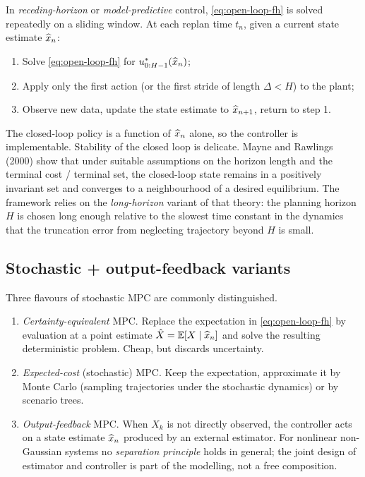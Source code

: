 In \emph{receding-horizon} or \emph{model-predictive} control,
\eqref{eq:open-loop-fh} is solved repeatedly on a sliding window. At
each replan time $t_n$, given a current state estimate $\widehat{x}_n$:
\begin{enumerate}
  \item Solve \eqref{eq:open-loop-fh} for $u_{0:H-1}^*(\widehat{x}_n)$;
  \item Apply only the first action (or the first stride of length
        $\Delta < H$) to the plant;
  \item Observe new data, update the state estimate to $\widehat{x}_{n+1}$,
        return to step 1.
\end{enumerate}
The closed-loop policy is a function of $\widehat{x}_n$ alone, so the
controller is implementable. Stability of the closed loop is delicate.
Mayne and Rawlings (2000) show that under suitable assumptions on the
horizon length and the terminal cost / terminal set, the closed-loop
state remains in a positively invariant set and converges to a
neighbourhood of a desired equilibrium. The framework relies on the
\emph{long-horizon} variant of that theory: the planning horizon $H$
is chosen long enough relative to the slowest time constant in the
dynamics that the truncation error from neglecting trajectory beyond
$H$ is small.

\subsection{Stochastic + output-feedback variants} \label{sec:mpc-variants}

Three flavours of stochastic MPC are commonly distinguished.

\begin{enumerate}
  \item[(i)] \emph{Certainty-equivalent} MPC. Replace the expectation
        in \eqref{eq:open-loop-fh} by evaluation at a point estimate
        $\hat X = \mathbb{E}[X \mid \widehat{x}_n]$ and solve the resulting
        deterministic problem. Cheap, but discards uncertainty.
  \item[(ii)] \emph{Expected-cost} (stochastic) MPC. Keep the
        expectation, approximate it by Monte Carlo (sampling
        trajectories under the stochastic dynamics) or by scenario
        trees.
  \item[(iii)] \emph{Output-feedback} MPC. When $X_k$ is not directly
        observed, the controller acts on a state estimate $\widehat{x}_n$
        produced by an external estimator. For nonlinear non-Gaussian
        systems no \emph{separation principle} holds in general; the
        joint design of estimator and controller is part of the
        modelling, not a free composition.
\end{enumerate}

